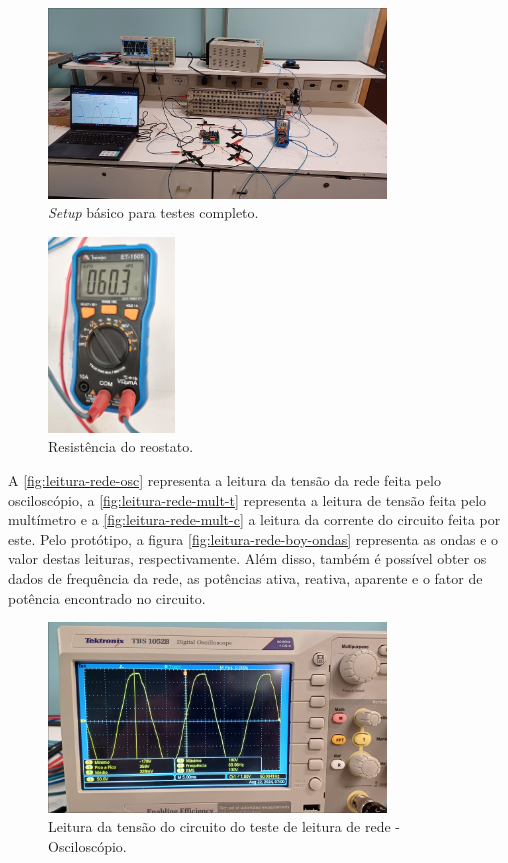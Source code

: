 \begin{figure}[htb!]
    \caption{\textit{Setup} básico para testes completo.}
    \label{fig:setup-main2}
    \includegraphics[width=0.8\textwidth]{figuras/setup-basico-full.png}
    \fonte{}
\end{figure}

\begin{figure}[htb!]
    \caption{Resistência do reostato.}
    \label{fig:resistencia-reostato-teste}
    \includegraphics[width=0.3\textwidth]{figuras/resistencia-reostato-teste.png}
    \fonte{}
\end{figure}

A \autoref{fig:leitura-rede-osc} representa a leitura da tensão da rede feita pelo osciloscópio, a \autoref{fig:leitura-rede-mult-t} representa a leitura de tensão feita pelo multímetro e a \autoref{fig:leitura-rede-mult-c} a leitura da corrente do circuito feita por este. Pelo protótipo, a figura \autoref{fig:leitura-rede-boy-ondas} representa as ondas e o valor destas leituras, respectivamente. Além disso, também é possível obter os dados de frequência da rede, as potências ativa, reativa, aparente e o fator de potência encontrado no circuito.

\begin{figure}[htb!]
    \caption{Leitura da tensão do circuito do teste de leitura de rede - Osciloscópio.}
    \label{fig:leitura-rede-osc}
    \includegraphics[width=0.8\textwidth]{figuras/leitura-rede-osc.png}
    \fonte{}
\end{figure}

